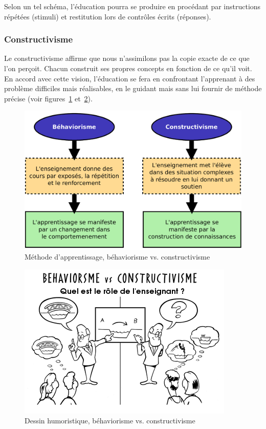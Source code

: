 Selon un tel schéma, l'éducation pourra se produire en procédant par instructions répétées (stimuli) et restitution lors de contrôles écrits (réponses).

\subsubsection{Constructivisme}
Le constructivisme affirme que nous n'assimilons pas la copie exacte
de ce que l'on perçoit. Chacun construit ses propres concepts en
fonction de ce qu'il voit. En accord avec cette vision, l'éducation
se fera en confrontant l'apprenant à des problème difficiles mais
réalisables, en le guidant mais sans lui fournir de méthode précise
(voir figures~\ref{fig:behaviorisme_vs_constructivisme_illu} et~\ref{fig:behaviorisme_vs_constructivisme_dessin}).

\begin{figure}[H]
  \centering
  \includegraphics[width=\textwidth]{../resources/illustrations/behaviorisme_constructivisme}
  \caption{Méthode d'apprentissage, béhaviorisme vs. constructivisme}
  \label{fig:behaviorisme_vs_constructivisme_illu}
\end{figure}
\begin{figure}[H]
  \centering
  \includegraphics[width=\textwidth]{../resources/illustrations/behaviorisme_vs_constructivisme}
  \caption{Dessin humoristique, béhaviorisme vs. constructivisme}
  \label{fig:behaviorisme_vs_constructivisme_dessin}
\end{figure}

